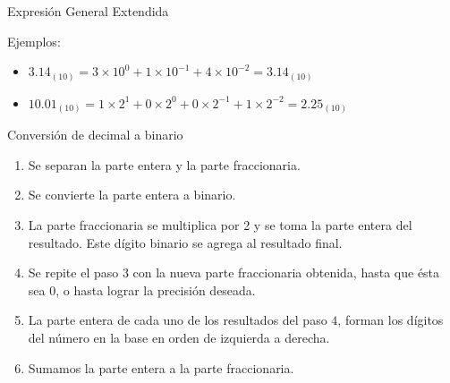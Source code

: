 \documentclass[11pt,a4paper,spanish]{beamer}
\begin{document}
\begin{frame}{Expresión General Extendida}

Ejemplos:

\begin{itemize}
    \item
        $3.14_{(10)} =
        3{\times}10^0+1{\times}10^{-1}+4{\times}10^{-2} =
        3.14_{(10)}$
    \item
        $10.01_{(10)} =
        1{\times}2^1+0{\times}2^0+0{\times}2^{-1}+1{\times}2^{-2} =
        2.25_{(10)}$
\end{itemize}
\end{frame}

\begin{frame}{Conversión de decimal a binario}
\begin{enumerate}
    \item Se separan la parte entera y la parte fraccionaria.

    \item Se convierte la parte entera a binario.

    \item La parte fraccionaria se multiplica por 2 y se toma la parte entera del resultado. Este dígito
        binario se agrega al resultado final.

    \item Se repite el paso $3$ con la nueva parte fraccionaria obtenida, hasta que ésta sea 0, o hasta
        lograr la precisión deseada.

    \item La parte entera de cada uno de los resultados del paso $4$, forman los dígitos del número en la
        base en orden de izquierda a derecha.

    \item Sumamos la parte entera a la parte fraccionaria.

\end{enumerate}
\end{frame}
\end{document}

